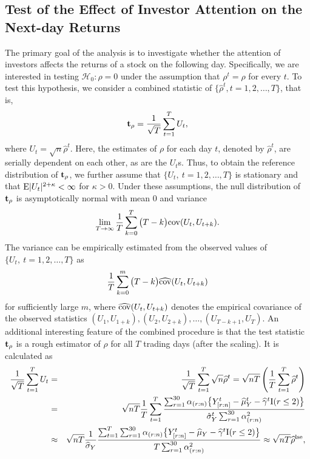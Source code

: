 \documentclass[12pt]{article}
\begin{document}
\subsection{Test of the Effect of Investor Attention on the Next-day Returns}

The primary goal of the analysis is to investigate whether the attention of investors affects the returns 
of a stock on the following day. Specifically, we are interested in testing $\mathcal{H}_0: \rho=0$ under 
the assumption that $\rho^t=\rho$ for every $t$. To test this hypothesis, we consider a combined statistic
of $\{ \widehat{\rho}^t, t=1,2,\ldots, T \}$, that is, 
\begin{equation} \label{eqn:teststat}
{\bf t}_{\rho} = \frac{1}{\sqrt{T}} \sum_{t=1}^T U_t,
\end{equation}
where $U_t= \sqrt{n} \widehat{\rho}^t$. Here, the estimates of $\rho$ for each day $t$, denoted
 by $\widehat{\rho}^t$, are serially dependent on each other, as are the $U_t$s. Thus, to obtain 
the reference distribution of ${\bf t}_{\rho}$, we further assume that
 $\{U_t, ~t=1,2,\ldots,T\}$ is stationary and that ${\rm E} | U_t |^{2+\kappa} < \infty$ for $\kappa>0$. 
Under these assumptions, 
the null distribution of ${\bf t}_{\rho}$ is asymptotically normal with mean $0$ and variance 
\begin{equation}\nonumber
\lim_{T \rightarrow \infty} \frac{1}{T} \sum_{k=0}^T \big( T-k\big) {\rm cov} (U_t, U_{t+k} ).
\end{equation}
The variance can be empirically estimated from the observed values of $\{U_t,~t=1,2,\ldots,T \}$ as
 \begin{equation}\nonumber
\frac{1}{T} \sum_{k=0}^m \big( T-k\big) \widehat{\rm cov} (U_t, U_{t+k} )
\end{equation}
for sufficiently large $m$, where $\widehat{\rm cov} (U_t, U_{t+k} )$ denotes
the empirical covariance of the observed statistics $(U_1, U_{1+k}), (U_2, U_{2+k}), \ldots, (U_{T-k+1} ,U_T)$.  An additional interesting feature of the combined procedure is that the test statistic ${\bf t}_{\rho}$ is a rough estimator of $\rho$ for all $T$ trading days (after 
the scaling). It is calculated as  
\begin{eqnarray}
\frac{1}{\sqrt{T}} \sum_{t=1}^T U_t &=& \frac{1}{\sqrt{T}} \sum_{t=1}^T \sqrt{n} \widehat{\rho}^t = 
\sqrt{n T} \left( \frac{1}{T} \sum_{t=1}^T \widehat{\rho}^t \right) \nonumber\\
&=& \sqrt{n T} \frac{1}{T}
\sum_{t=1}^T \frac{  \sum_{r=1}^{30} \alpha_{(r:n)} \big\{ Y_{[r:n]}^t - \widehat{\mu}_Y^t  - \widehat{\gamma}^t {\rm I} (r \le 2) \big\}} 
{\hat{\sigma}_Y^t \sum_{r=1}^{30} \alpha_{(r:n)}^2} \nonumber \\
&\approx& \sqrt{n T} \frac{1}{\widehat{\sigma}_Y}
\frac{ \sum_{t=1}^T \sum_{r=1}^{30} \alpha_{(r:n)} \big\{ Y_{[r:n]}^t - \widehat{\mu}_Y- \widehat{\gamma}^t {\rm I} (r \le 2)  \big\}} 
{T \sum_{r=1}^{30} \alpha_{(r:n)}^2} \approx \sqrt{ n T}  \widehat{\rho}^{\rm lse},  \label{eqn:equiv}
\end{eqnarray}
\end{document}
